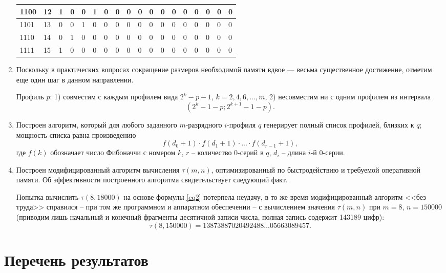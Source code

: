 \begin{enumerate}
\begin {table}[ht]
\begin{center}
\begin{tabular}{|p{0.19in}|p{0.15in}|p{0.19in}|p{0.19in}|p{0.19in}|p{0.19in}|p{0.19in}|p{0.19in}|p{0.19in}|p{0.19in}|p{0.19in}|p{0.19in}|p{0.19in}|p{0.19in}|p{0.19in}|p{0.19in}|p{0.19in}|p{0.19in}| }
\hline
\scriptsize{1100} & 12 & 1 & 0 & 0 & 1 & 0 & 0 & 0 & 0 & 0 & 0 & 0 & 0 & 0 & 0 & 0 & 0 \\
\hline
\scriptsize{1101} & 13 & 0 & 0 & 1 & 0 & 0 & 0 & 0 & 0 & 0 & 0 & 0 & 0 & 0 & 0 & 0 & 0 \\
\hline
\scriptsize{1110} & 14 & 0 & 1 & 0 & 0 & 0 & 0 & 0 & 0 & 0 & 0 & 0 & 0 & 0 & 0 & 0 & 0 \\
\hline
\scriptsize{1111} & 15 & 1 & 0 & 0 & 0 & 0 & 0 & 0 & 0 & 0 & 0 & 0 & 0 & 0 & 0 & 0 & 0 \\
\hline 
\end{tabular}
\end{center}
\end{table}

\item
Поскольку в практических вопросах сокращение размеров необходимой памяти вдвое --- весьма существенное достижение, отметим еще один шаг в данном направлении.

Профиль $p$: 
1) совместим с каждым профилем вида $2^k-p-1$, $k=2,4,6,\dots,m$,
2) несовместим ни с одним профилем из интервала
$$(2^k-1-p ; 2^{k+1}-1-p).$$

\item
Построен алгоритм, который для любого заданного $m$-разрядного $i$-профиля $q$ генерирует полный список профилей, близких к $q$;\\
мощность списка равна произведению
$$f(d_0+1) \cdot  f(d_1+1)\cdot ... \cdot  f(d_{r-1}+1),$$
где $f(k)$ обозначает число Фибоначчи с номером $k$, $r$ -- количество 0-серий в $q$, $d_i$ -- длина $i$-й 0-серии.
\item 
Построен модифицированный алгоритм вычисления $\tau(m,n)$, оптимизированный по быстродействию и требуемой оперативной памяти.
Об эффективности построенного алгоритма свидетельствует следующий факт.

Попытка вычислить $\tau(8,18000)$ на основе формулы \eqref{eq2} потерпела неудачу, в то же время модифицированный алгоритм <<без труда>> справился -- при том же программном и аппаратном обеспечении -- с вычислением значения $\tau(m,n)$ при $m=8$, $n=150000$ (приводим лишь начальный и конечный фрагменты десятичной записи числа, полная запись содержит 143189 цифр):
$$\tau(8,150000)=13873887020492488 \dots 05663089457. $$

\end{enumerate}

\section{Перечень результатов}

